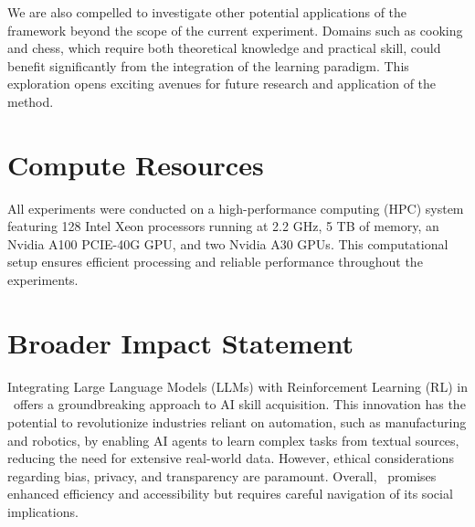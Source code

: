 We are also compelled to investigate other potential applications of the framework beyond the scope of the current experiment. Domains such as cooking and chess, which require both theoretical knowledge and practical skill, could benefit significantly from the integration of the learning paradigm. This exploration opens exciting avenues for future research and application of the method.

\section{Compute Resources}
\label{app:cr}

All experiments were conducted on a high-performance computing (HPC) system featuring 128 Intel Xeon processors running at 2.2 GHz, 5 TB of memory, an Nvidia A100 PCIE-40G GPU, and two Nvidia A30 GPUs. This computational setup ensures efficient processing and reliable performance throughout the experiments. 



\section{Broader Impact Statement}
\label{app:si}

Integrating Large Language Models (LLMs) with Reinforcement Learning (RL) in \topic~offers a groundbreaking approach to AI skill acquisition. This innovation has the potential to revolutionize industries reliant on automation, such as manufacturing and robotics, by enabling AI agents to learn complex tasks from textual sources, reducing the need for extensive real-world data. However, ethical considerations regarding bias, privacy, and transparency are paramount. Overall, \topic~promises enhanced efficiency and accessibility but requires careful navigation of its social implications.